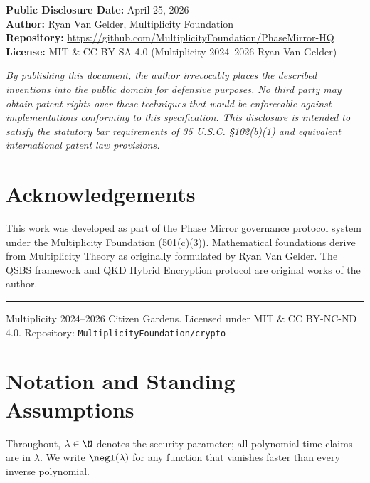 \documentclass[11pt,letterpaper]{article}
\begin{document}
\vspace{1em}
\noindent\textbf{Public Disclosure Date:} April 25, 2026\\
\textbf{Author:} Ryan Van Gelder, Multiplicity Foundation\\
\textbf{Repository:} \url{https://github.com/MultiplicityFoundation/PhaseMirror-HQ}\\
\textbf{License:} MIT \& CC BY-SA 4.0 (Multiplicity \textcopyright{} 2024--2026 Ryan Van Gelder)

\vspace{1em}
\begin{mdframed}[linecolor=mfblue,linewidth=1pt]
\small\textit{By publishing this document, the author irrevocably places the
described inventions into the public domain for defensive purposes. No third
party may obtain patent rights over these techniques that would be enforceable
against implementations conforming to this specification. This disclosure is
intended to satisfy the statutory bar requirements of 35 U.S.C. \S{}102(b)(1)
and equivalent international patent law provisions.}
\end{mdframed}
\section*{Acknowledgements}

This work was developed as part of the Phase Mirror governance protocol system
under the Multiplicity Foundation (501(c)(3)). Mathematical foundations derive from
Multiplicity Theory as originally formulated by Ryan Van Gelder. The QSBS
framework and QKD Hybrid Encryption protocol are original works of the author.

\vspace{2em}
\hrule
\vspace{0.5em}
\noindent\small Multiplicity \textcopyright{} 2024--2026 Citizen Gardens.
Licensed under MIT \& CC BY-NC-ND 4.0.
Repository: \texttt{MultiplicityFoundation/crypto}

\section{Notation and Standing Assumptions}
\label{sec:notation}

Throughout, $\lambda \in \N$ denotes the security parameter; all
polynomial-time claims are in $\lambda$. We write $\negl(\lambda)$ for any
function that vanishes faster than every inverse polynomial.
\end{document}
